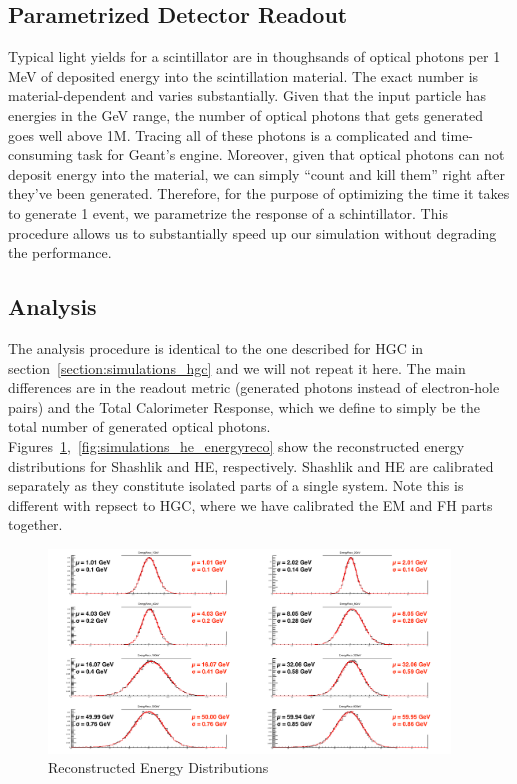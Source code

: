 \subsection{Parametrized Detector Readout}
Typical light yields for a scintillator are in thoughsands of optical photons per 1 MeV of deposited energy into the scintillation material. The exact number is material-dependent and varies substantially. Given that the input particle has energies in the GeV range, the number of optical photons that gets generated goes well above 1M. Tracing all of these photons is a complicated and time-consuming task for Geant's engine. Moreover, given that optical photons can not deposit energy into the material, we can simply ``count and kill them'' right after they've been generated. Therefore, for the purpose of optimizing the time it takes to generate 1 event, we parametrize the response of a schintillator. This procedure allows us to substantially speed up our simulation without degrading the performance.

\subsection{Analysis}
The analysis procedure is identical to the one described for HGC in section~\ref{section:simulations_hgc} and we will not repeat it here. The main differences are in the readout metric (generated photons instead of electron-hole pairs) and the Total Calorimeter Response, which we define to simply be the total number of generated optical photons. Figures~\ref{fig:simulations_shashlik_energyreco},~\ref{fig:simulations_he_energyreco} show the reconstructed energy distributions for Shashlik and HE, respectively. Shashlik and HE are calibrated separately as they constitute isolated parts of a single system. Note this is different with repsect to HGC, where we have calibrated the EM and FH parts together.

\begin{figure}[hbp]
    \centering
    \includegraphics[width=0.95\textwidth]{figures/ch_simulations/shashlik/performance/EnergyRecoDistributions.png}
    \caption{Reconstructed Energy Distributions}
    \label{fig:simulations_shashlik_energyreco}
 \end{figure}

